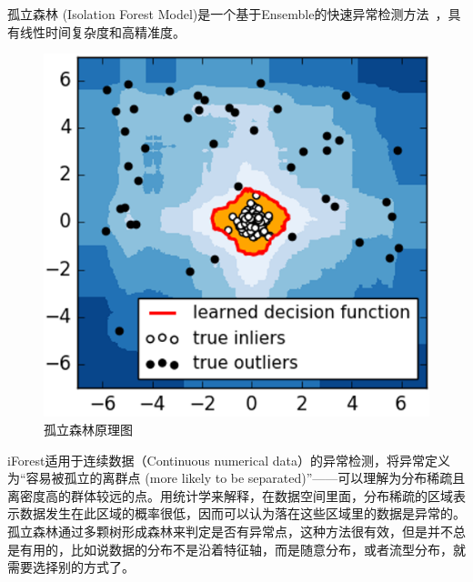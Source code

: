 孤立森林 (Isolation Forest Model)是一个基于Ensemble的快速异常检测方法~\cite{杨晓晖2019基于多粒度级联孤立森林算法的异常检测模型}，具有线性时间复杂度和高精准度。

\begin{figure}[htbp]
  \centering
  \includegraphics[scale=0.85]{figure/chapter4/孤立森林原理图.png}
  \caption{孤立森林原理图}\label{gulisenlin}
\end{figure}

iForest适用于连续数据（Continuous numerical data）的异常检测，将异常定义为“容易被孤立的离群点 (more likely to be separated)”——可以理解为分布稀疏且离密度高的群体较远的点。用统计学来解释，在数据空间里面，分布稀疏的区域表示数据发生在此区域的概率很低，因而可以认为落在这些区域里的数据是异常的。
孤立森林通过多颗树形成森林来判定是否有异常点，这种方法很有效，但是并不总是有用的，比如说数据的分布不是沿着特征轴，而是随意分布，或者流型分布，就需要选择别的方式了。


